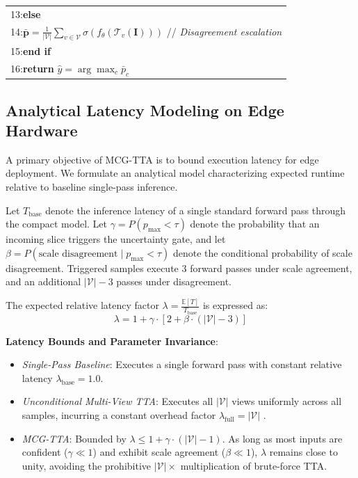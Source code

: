 \documentclass[journal]{IEEEtran}
\begin{document}
\begin{table}[h]
\begin{tabular}{p{}}
13:\hspace{0.5em}\textbf{else} \\[0.2ex]
14:\hspace{1.5em}$\bar{\mathbf{p}} = \frac{1}{|\mathcal{V}|} \sum_{v \in \mathcal{V}} \sigma(f_\theta(\mathcal{T}_v(\mathbf{I})))$ \hfill // \emph{Disagreement escalation} \\[0.2ex]
15:\hspace{0.5em}\textbf{end if} \\[0.2ex]
16:\hspace{0.5em}\textbf{return} $\hat{y} = \arg\max_c \bar{p}_c$ \\
\bottomrule
\end{tabular}
\label{alg:mcg_tta}
\end{table}


\subsection{Analytical Latency Modeling on Edge Hardware}

A primary objective of MCG-TTA is to bound execution latency for edge deployment. We formulate an analytical model characterizing expected runtime relative to baseline single-pass inference.

Let $T_{\text{base}}$ denote the inference latency of a single standard forward pass through the compact model. Let $\gamma = P(p_{\max} < \tau)$ denote the probability that an incoming slice triggers the uncertainty gate, and let $\beta = P(\text{scale disagreement} \mid p_{\max} < \tau)$ denote the conditional probability of scale disagreement. Triggered samples execute 3 forward passes under scale agreement, and an additional $|\mathcal{V}| - 3$ passes under disagreement.

The expected relative latency factor $\lambda = \frac{\mathbb{E}[T]}{T_{\text{base}}}$ is expressed as:
\begin{equation}
\lambda = 1 + \gamma \cdot \left[ 2 + \beta \cdot (|\mathcal{V}| - 3) \right]
\label{eq:latency}
\end{equation}

\noindent\textbf{Latency Bounds and Parameter Invariance}:
\begin{itemize}
\item \emph{Single-Pass Baseline}: Executes a single forward pass with constant relative latency $\lambda_{\text{base}} = 1.0$.
\item \emph{Unconditional Multi-View TTA}: Executes all $|\mathcal{V}|$ views uniformly across all samples, incurring a constant overhead factor $\lambda_{\text{full}} = |\mathcal{V}|$ \cite{42}.
\item \emph{MCG-TTA}: Bounded by $\lambda \le 1 + \gamma \cdot (|\mathcal{V}| - 1)$. As long as most inputs are confident ($\gamma \ll 1$) and exhibit scale agreement ($\beta \ll 1$), $\lambda$ remains close to unity, avoiding the prohibitive $|\mathcal{V}|\times$ multiplication of brute-force TTA.
\end{itemize}
\end{document}
